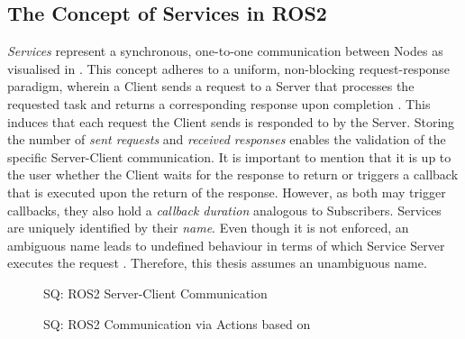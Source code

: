     
    \subsection{The Concept of Services in ROS2} \label{subsec:model:services}
        \emph{Services} represent a synchronous, one-to-one communication between Nodes as visualised in . This concept adheres to a uniform, non-blocking request-response paradigm, wherein a Client sends a request to a Server that processes the requested task and returns a corresponding response upon completion \cite[p.~4]{ROS2usesInTheWild}. This induces that each request the Client sends is responded to by the Server. Storing the number of \emph{sent requests} and \emph{received responses} enables the validation of the specific Server-Client communication. It is important to mention that it is up to the user whether the Client waits for the response to return or triggers a callback that is executed upon the return of the response. However, as both may trigger callbacks, they also hold a \emph{callback duration} analogous to Subscribers.\newline
        Services are uniquely identified by their \emph{name}. Even though it is not enforced, an ambiguous name leads to undefined behaviour in terms of which Service Server executes the request \cite{website:services}. Therefore, this thesis assumes an unambiguous name.
        \begin{figure}[h]
            \centering
            
            \caption[Communication via Services in ROS2]{SQ: ROS2 Server-Client Communication} \label{fig:tikz:SQ:SrvCli}
        \end{figure}

        \begin{landscape}
            \begin{figure}[h]
                \hspace*{-.6cm}
                \vspace*{.6cm}
                
                \caption[Communication via Actions in ROS2]{SQ: ROS2 Communication via Actions based on \cite{website:actions}} \label{fig:tikz:SQ:Action}
            \end{figure}
        \end{landscape}

